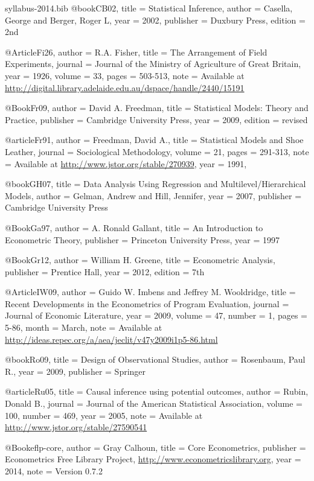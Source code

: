 \begin{filecontents}{syllabus-2014.bib}
@book{CB02,
  title =	 {Statistical Inference},
  author =	 {Casella, George and Berger, Roger L},
  year =	 2002,
  publisher =	 {Duxbury Press},
  edition =	 {2nd}
}

@Article{Fi26,
  author =	 {R.A. Fisher},
  title =	 {The Arrangement of Field Experiments},
  journal =	 {Journal of the Ministry of Agriculture of Great
                  Britain},
  year =	 1926,
  volume =	 33,
  pages =	 {503-513},
  note =	 {Available at
                  \url{http://digital.library.adelaide.edu.au/dspace/handle/2440/15191}}
}

@Book{Fr09,
  author =	 {David A. Freedman},
  title =	 {Statistical Models: Theory and Practice},
  publisher =	 {Cambridge University Press},
  year =	 2009,
  edition =	 {revised}
}

@article{Fr91,
  author =	 {Freedman, David A.},
  title =	 {Statistical Models and Shoe Leather},
  journal =	 {Sociological Methodology},
  volume =	 21,
  pages =	 {291-313},
  note =	 {Available at
                  \url{http://www.jstor.org/stable/270939}},
  year =	 1991,
}

@book{GH07,
  title =	 {Data Analysis Using Regression and
                  Multilevel/Hierarchical Models},
  author =	 {Gelman, Andrew and Hill, Jennifer},
  year =	 2007,
  publisher =	 {Cambridge University Press}
}

@Book{Ga97,
  author =	 {A. Ronald Gallant},
  title =	 {An Introduction to Econometric Theory},
  publisher =	 {Princeton University Press},
  year =	 1997
}

@Book{Gr12,
  author =	 {William H. Greene},
  title =	 {Econometric Analysis},
  publisher =	 {Prentice Hall},
  year =	 2012,
  edition =	 {7th}
}

@Article{IW09,
  author =	 {Guido W. Imbens and Jeffrey M. Wooldridge},
  title =	 {Recent Developments in the Econometrics of Program
                  Evaluation},
  journal =	 {Journal of Economic Literature},
  year =	 2009,
  volume =	 47,
  number =	 1,
  pages =	 {5-86},
  month =	 {March},
  note =	 {Available at
                  \url{http://ideas.repec.org/a/aea/jeclit/v47y2009i1p5-86.html}}
}

@book{Ro09,
  title =	 {Design of Observational Studies},
  author =	 {Rosenbaum, Paul R.},
  year =	 2009,
  publisher =	 {Springer}
}

@article{Ru05,
  title =	 {Causal inference using potential outcomes},
  author =	 {Rubin, Donald B.},
  journal =	 {Journal of the American Statistical Association},
  volume =	 100,
  number =	 469,
  year =	 2005,
  note =	 {Available at
                  \url{http://www.jstor.org/stable/27590541}}
}

@Book{eflp-core,
  author =	 {Gray Calhoun},
  title =	 {Core Econometrics},
  publisher =	 {Econometrics Free Library Project,
                  \url{http://www.econometricslibrary.org}},
  year =	 2014,
  note =	 {Version 0.7.2}
}
\end{filecontents}

